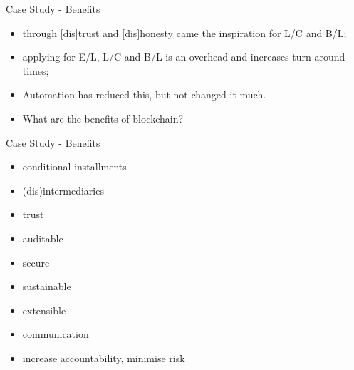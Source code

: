 \documentclass[pdf,table]{beamer}
\begin{document}
\begin{frame}{Case Study - Benefits}
	\begin{itemize}
		\item through [dis]trust and [dis]honesty came the inspiration for L/C and B/L;
		\item applying for E/L, L/C and B/L is an overhead and increases turn-around-times;
		\item Automation has reduced this, but not changed it much.
		\item What are the benefits of blockchain?
	\end{itemize}
\end{frame}

\begin{frame}{Case Study - Benefits}
	\begin{itemize}
		\item conditional installments 
		\item (dis)intermediaries
		\item trust
		\item auditable
		\item secure
		\item sustainable
		\item extensible
		\item communication 
		\item increase accountability, minimise risk
	\end{itemize}
\end{frame}


\end{document}
